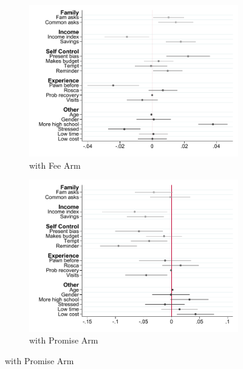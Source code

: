 \documentclass[oneside,11pt]{article}
\begin{document}
\begin{figure}[H]
    \caption{Predictors of commitment contract take-up}
    \label{interactions_takeup}
    \begin{center}
    \begin{subfigure}{0.45\textwidth}
        \caption{with Fee Arm}
        \centering
        \includegraphics[width=\textwidth]{Figuras/pago_frec_vol_fee_interactions_rf.pdf}
    \end{subfigure}
    \begin{subfigure}{0.45\textwidth}
        \caption{with Promise Arm}
        \centering
        \includegraphics[width=\textwidth]{Figuras/pago_frec_vol_promise_interactions_rf.pdf}
    \end{subfigure}
    \end{center}
     \scriptsize
\end{figure}
\end{document}
